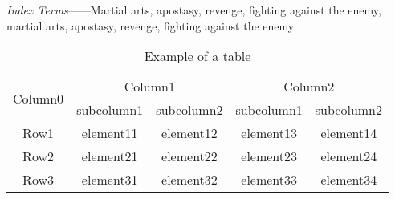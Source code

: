 \documentclass[doctor, vlined]{DissertUESTC}
\begin{document}
	\textit{Index Terms}——Martial arts, apostasy, revenge, fighting against the enemy, martial arts, apostasy, revenge, fighting against the enemy


	\begin{table}[htp]
		\captionsetup{list=no}%
		\caption{Example of a table}
		\begin{tabular}{ccccc}
			\toprule
			\multirow{2}{*}{Column0} &  \multicolumn{2}{c}{Column1\tnote{1}} & \multicolumn{2}{c}{Column2\tnote{2}} \\
			\cmidrule(lr){2-3}\cmidrule(l){4-5}
			~     & subcolumn1 & subcolumn2 & subcolumn1 & subcolumn2 \\
			\midrule
			Row1  & element11 & element12 &element13 & element14 \\
			Row2  & element21 & element22 &element23 & element24 \\
			\cmidrule{2-3}\cmidrule{4-5}
			Row3  & element31 & element32 &element33 & element34 \\
			\bottomrule
		\end{tabular}
	\end{table}




\end{document}
